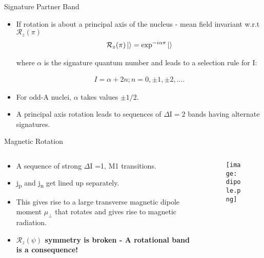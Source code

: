 \documentclass [11pt]{beamer}
\begin{document}
\begin{frame}{Signature Partner Band}
\begin{itemize}
\item {
If rotation is about a principal axis of the nucleus - mean field invariant w.r.t $\mathcal{R}_{z}(\pi)$ 
\begin{align*}
\mathcal{R}_{z}(\pi)\ket{} = \exp^{-i\alpha\pi}\ket{}
\end{align*}

where $\alpha$ is the signature quantum number and leads to a selection rule for $\mathrm{I}$:

\begin{align*}
I = \alpha + 2n; n = 0, \pm 1, \pm 2, ....
\end{align*} 
}
\item {For odd-A nuclei, $\alpha$ takes values $\pm 1/2$. }
\item {A principal axis rotation leads to sequences of $\Delta\mathrm{I} = 2$ bands having alternate signatures.} 
\end{itemize}
\end{frame}


\begin{frame}{Magnetic Rotation}
\begin{columns}[c]
\begin{column}{0.6\textwidth}
\begin{itemize}
\item {A sequence of strong $\Delta\mathrm{I}$ =1, M1 transitions.}
\item {j\textsubscript{p} and j\textsubscript{n} get lined up separately.}
\item {This gives rise to a large transverse magnetic dipole moment $\mu_{\perp}$ that rotates and gives rise to magnetic radiation.}
\item {\textbf{$\mathcal{R}_{z}(\psi)$ symmetry is broken - A rotational band is a consequence!}}
\end{itemize}
\end{column}
\begin{column}{0.4\textwidth}
\begin{figure}
\texttt{[image: dipole.png]}
\end{figure}
\end{column}
\end{columns}
\end{frame}
\end{document}
